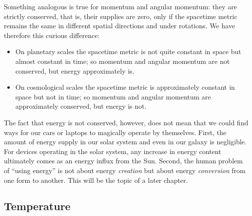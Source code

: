 \documentclass[a4paper,12pt,%
onecolumn,oneside,%
british%
]{memoir}
\newcommand{\mynotew}[1]{{\footnotesize\color{midgrey}\faIcon{tools}\ #1}}
\renewcommand*{\|}[1][]{\nonscript\:#1\vert\nonscript\:\mathopen{}}
\begin{document}
\smallskip

Something analogous is true for momentum and angular momentum: they are strictly conserved, that is, their supplies are zero, only if the spacetime metric remains the same in different spatial directions and under rotations. We have therefore this curious difference:
\begin{itemize}
\item On planetary scales the spacetime metric is not quite constant in space but almost constant in time; so momentum and angular momentum are not conserved, but energy approximately is.
\item On cosmological scales the spacetime metric is approximately constant in space but not in time; so momentum and angular momentum are approximately conserved, but energy is not.
\end{itemize}

\medskip

The fact that energy is not conserved, however, does not mean that we could find ways for our cars or laptops to magically operate by themselves. First, the amount of energy supply in our solar system and even in our galaxy is negligible. %
For devices operating in the solar system, any increase in energy content ultimately comes as an energy influx from the Sun. Second, the human problem of \enquote{using energy} is not about energy \emph{creation} but about energy \emph{conversion} from one form to another. This will be the topic of a later chapter.

\subsection{Temperature}
\label{sec:temperature}
\end{document}
